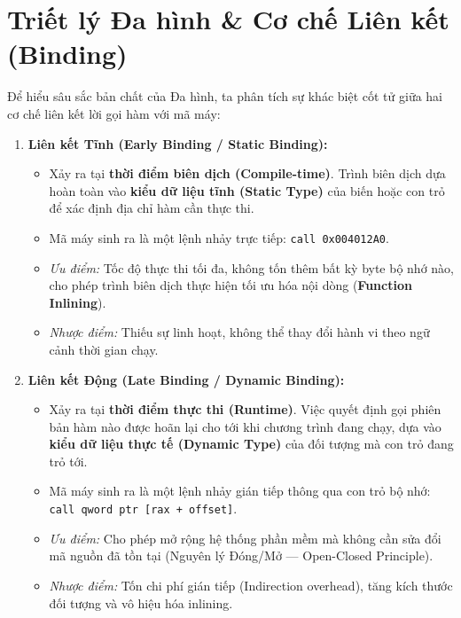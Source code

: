 \documentclass[12pt,a4paper,oneside]{book}
\begin{document}
\section{Triết lý Đa hình \& Cơ chế Liên kết (Binding)}

Để hiểu sâu sắc bản chất của Đa hình, ta phân tích sự khác biệt cốt tử giữa hai cơ chế liên kết lời gọi hàm với mã máy:

\begin{enumerate}
    \item \textbf{Liên kết Tĩnh (Early Binding / Static Binding):}
    \begin{itemize}
        \item Xảy ra tại \textbf{thời điểm biên dịch (Compile-time)}. Trình biên dịch dựa hoàn toàn vào \textbf{kiểu dữ liệu tĩnh (Static Type)} của biến hoặc con trỏ để xác định địa chỉ hàm cần thực thi.
        \item Mã máy sinh ra là một lệnh nhảy trực tiếp: \texttt{call 0x004012A0}.
        \item \textit{Ưu điểm:} Tốc độ thực thi tối đa, không tốn thêm bất kỳ byte bộ nhớ nào, cho phép trình biên dịch thực hiện tối ưu hóa nội dòng (\textbf{Function Inlining}).
        \item \textit{Nhược điểm:} Thiếu sự linh hoạt, không thể thay đổi hành vi theo ngữ cảnh thời gian chạy.
    \end{itemize}

    \item \textbf{Liên kết Động (Late Binding / Dynamic Binding):}
    \begin{itemize}
        \item Xảy ra tại \textbf{thời điểm thực thi (Runtime)}. Việc quyết định gọi phiên bản hàm nào được hoãn lại cho tới khi chương trình đang chạy, dựa vào \textbf{kiểu dữ liệu thực tế (Dynamic Type)} của đối tượng mà con trỏ đang trỏ tới.
        \item Mã máy sinh ra là một lệnh nhảy gián tiếp thông qua con trỏ bộ nhớ: \texttt{call qword ptr [rax + offset]}.
        \item \textit{Ưu điểm:} Cho phép mở rộng hệ thống phần mềm mà không cần sửa đổi mã nguồn đã tồn tại (Nguyên lý Đóng/Mở --- Open-Closed Principle).
        \item \textit{Nhược điểm:} Tốn chi phí gián tiếp (Indirection overhead), tăng kích thước đối tượng và vô hiệu hóa inlining.
    \end{itemize}
\end{enumerate}
\end{document}
